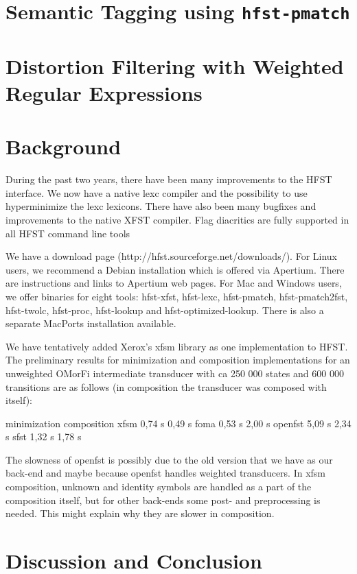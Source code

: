 \documentclass{llncs}
\begin{document}
\section{Semantic Tagging using {\tt hfst-pmatch}}\label{sec:sem-tagging}

\section{Distortion Filtering with Weighted Regular Expressions}

\section{Background}\label{sec:background}
During the past two years, there have been many improvements to the HFST interface.
We now have a native lexc compiler and the possibility to use hyperminimize the lexc
lexicons. There have also been many bugfixes and improvements to the native XFST compiler.
Flag diacritics are fully supported in all HFST command line tools

We have a download page (http://hfst.sourceforge.net/downloads/). For Linux users, we recommend
a Debian installation which is offered via Apertium. There are instructions and links to Apertium web pages.
For Mac and Windows users, we offer binaries for eight tools:
hfst-xfst, hfst-lexc, hfst-pmatch, hfst-pmatch2fst, hfst-twolc, hfst-proc, hfst-lookup and hfst-optimized-lookup.
There is also a separate MacPorts installation available.

We have tentatively added Xerox's xfsm library as one implementation to HFST.
The preliminary results for minimization and composition implementations for an unweighted OMorFi intermediate transducer
with ca 250 000 states and 600 000 transitions are as follows (in composition the transducer was composed with itself):
            
         minimization composition
xfsm      0,74 s       0,49 s
foma      0,53 s       2,00 s
openfst   5,09 s       2,34 s
sfst      1,32 s       1,78 s

The slowness of openfst is possibly due to the old version that we have as our back-end and maybe
because openfst handles weighted transducers. 
In xfsm composition, unknown and identity symbols are handled as a part of the composition itself,
but for other back-ends some post- and preprocessing is needed. This might explain why they are slower in composition.

\section{Discussion and Conclusion}\label{sec:discussion}



\end{document}
